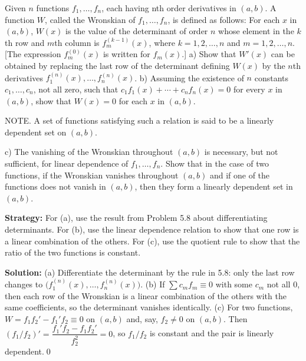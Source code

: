 \begin{problembox}
\begin{problemstatement}
Given \( n \) functions \( f_1, \ldots, f_n \), each having nth order derivatives in \( (a, b) \). A function \( W \), called the Wronskian of \( f_1, \ldots, f_n \), is defined as follows: For each \( x \) in \( (a, b) \), \( W(x) \) is the value of the determinant of order \( n \) whose element in the \( k \)th row and \( m \)th column is \( f_m^{(k-1)}(x) \), where \( k = 1, 2, \ldots, n \) and \( m = 1, 2, \ldots, n \). [The expression \( f_m^{(0)}(x) \) is written for \( f_m(x) \).]
a) Show that \( W'(x) \) can be obtained by replacing the last row of the determinant defining \( W(x) \) by the \( n \)th derivatives \( f_1^{(n)}(x), \ldots, f_n^{(n)}(x) \).
b) Assuming the existence of \( n \) constants \( c_1, \ldots, c_n \), not all zero, such that \( c_1 f_1(x) + \cdots + c_n f_n(x) = 0 \) for every \( x \) in \( (a, b) \), show that \( W(x) = 0 \) for each \( x \) in \( (a, b) \).

NOTE. A set of functions satisfying such a relation is said to be a linearly dependent set on \( (a, b) \).

c) The vanishing of the Wronskian throughout \( (a, b) \) is necessary, but not sufficient, for linear dependence of \( f_1, \ldots, f_n \). Show that in the case of two functions, if the Wronskian vanishes throughout \( (a, b) \) and if one of the functions does not vanish in \( (a, b) \), then they form a linearly dependent set in \( (a, b) \).
\end{problemstatement}
\end{problembox}

\noindent\textbf{Strategy:} For (a), use the result from Problem 5.8 about differentiating determinants. For (b), use the linear dependence relation to show that one row is a linear combination of the others. For (c), use the quotient rule to show that the ratio of the two functions is constant.

\bigskip\noindent\textbf{Solution:}
(a) Differentiate the determinant by the rule in 5.8: only the last row changes to $\big(f_1^{(n)}(x),\dots,f_n^{(n)}(x)\big)$. (b) If $\sum c_m f_m\equiv 0$ with some $c_m$ not all $0$, then each row of the Wronskian is a linear combination of the others with the same coefficients, so the determinant vanishes identically. (c) For two functions, $W=f_1 f_2'-f_1'f_2\equiv 0$ on $(a,b)$ and, say, $f_2\ne 0$ on $(a,b)$. Then $(f_1/f_2)'=\dfrac{f_1'f_2-f_1 f_2'}{f_2^2}=0$, so $f_1/f_2$ is constant and the pair is linearly dependent.\qed

